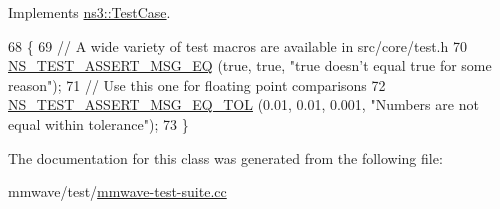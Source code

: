 Implements \hyperlink{classns3_1_1TestCase_a8ff74680cf017ed42011e4be51917a24}{ns3\+::\+Test\+Case}.


\begin{DoxyCode}
68 \{
69   \textcolor{comment}{// A wide variety of test macros are available in src/core/test.h}
70   \hyperlink{group__testing_ga2a9d78cffb3db8e867c35fff0b698cf5}{NS\_TEST\_ASSERT\_MSG\_EQ} (\textcolor{keyword}{true}, \textcolor{keyword}{true}, \textcolor{stringliteral}{"true doesn't equal true for some reason"});
71   \textcolor{comment}{// Use this one for floating point comparisons}
72   \hyperlink{group__testing_ga9e7861b56b4e70db3b56044cb7a28e41}{NS\_TEST\_ASSERT\_MSG\_EQ\_TOL} (0.01, 0.01, 0.001, \textcolor{stringliteral}{"Numbers are not equal within
       tolerance"});
73 \}
\end{DoxyCode}


The documentation for this class was generated from the following file\+:\begin{DoxyCompactItemize}
\item 
mmwave/test/\hyperlink{mmwave-test-suite_8cc}{mmwave-\/test-\/suite.\+cc}\end{DoxyCompactItemize}
